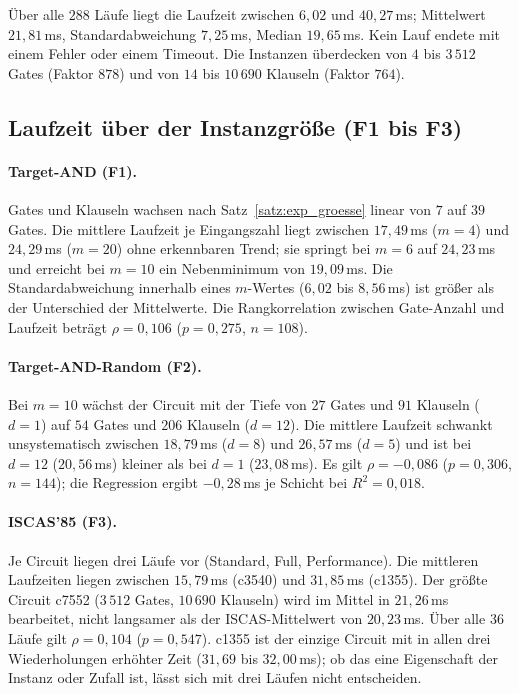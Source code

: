 Über alle $288$ Läufe liegt die Laufzeit zwischen $6{,}02$ und $40{,}27$\,ms; Mittelwert $21{,}81$\,ms, Standardabweichung $7{,}25$\,ms, Median $19{,}65$\,ms. Kein Lauf endete mit einem Fehler oder einem Timeout. Die Instanzen überdecken von $4$ bis $3\,512$ Gates (Faktor $878$) und von $14$ bis $10\,690$ Klauseln (Faktor $764$).

\subsection{Laufzeit über der Instanzgröße (F1 bis F3)}

\paragraph{Target-AND (F1).} Gates und Klauseln wachsen nach Satz~\ref{satz:exp_groesse} linear von $7$ auf $39$ Gates. Die mittlere Laufzeit je Eingangszahl liegt zwischen $17{,}49$\,ms ($m=4$) und $24{,}29$\,ms ($m=20$) ohne erkennbaren Trend; sie springt bei $m=6$ auf $24{,}23$\,ms und erreicht bei $m=10$ ein Nebenminimum von $19{,}09$\,ms. Die Standardabweichung innerhalb eines $m$-Wertes ($6{,}02$ bis $8{,}56$\,ms) ist größer als der Unterschied der Mittelwerte. Die Rangkorrelation zwischen Gate-Anzahl und Laufzeit beträgt $\rho=0{,}106$ ($p=0{,}275$, $n=108$).

\paragraph{Target-AND-Random (F2).} Bei $m=10$ wächst der Circuit mit der Tiefe von $27$ Gates und $91$ Klauseln ($d=1$) auf $54$ Gates und $206$ Klauseln ($d=12$). Die mittlere Laufzeit schwankt unsystematisch zwischen $18{,}79$\,ms ($d=8$) und $26{,}57$\,ms ($d=5$) und ist bei $d=12$ ($20{,}56$\,ms) kleiner als bei $d=1$ ($23{,}08$\,ms). Es gilt $\rho=-0{,}086$ ($p=0{,}306$, $n=144$); die Regression ergibt $-0{,}28$\,ms je Schicht bei $R^2=0{,}018$.

\paragraph{ISCAS'85 (F3).} Je Circuit liegen drei Läufe vor (Standard, Full, Performance). Die mittleren Laufzeiten liegen zwischen $15{,}79$\,ms (c3540) und $31{,}85$\,ms (c1355). Der größte Circuit c7552 ($3\,512$ Gates, $10\,690$ Klauseln) wird im Mittel in $21{,}26$\,ms bearbeitet, nicht langsamer als der ISCAS-Mittelwert von $20{,}23$\,ms. Über alle $36$ Läufe gilt $\rho=0{,}104$ ($p=0{,}547$). c1355 ist der einzige Circuit mit in allen drei Wiederholungen erhöhter Zeit ($31{,}69$ bis $32{,}00$\,ms); ob das eine Eigenschaft der Instanz oder Zufall ist, lässt sich mit drei Läufen nicht entscheiden.

